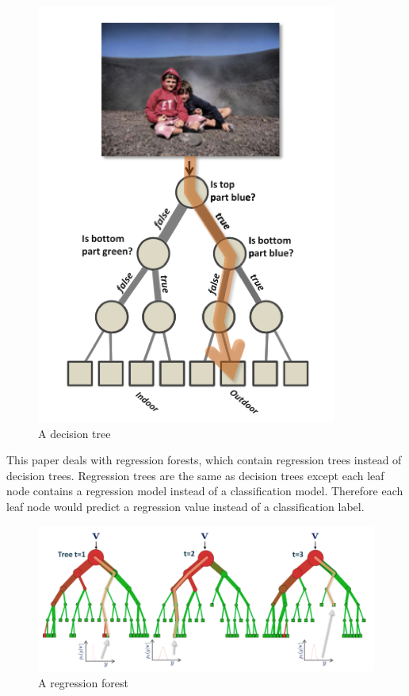 \begin{figure}
\includegraphics[scale=0.5]{decisiontree.png}
\caption{A decision tree}
\end{figure}

This paper deals with regression forests, which contain regression trees instead of decision trees. Regression trees are the same as decision trees except each leaf node contains a regression model instead of a classification model. Therefore each leaf node would predict a regression value instead of a classification label.

\begin{figure}
\includegraphics[scale=0.45]{regressionforest.png}
\caption{A regression forest}
\end{figure}

